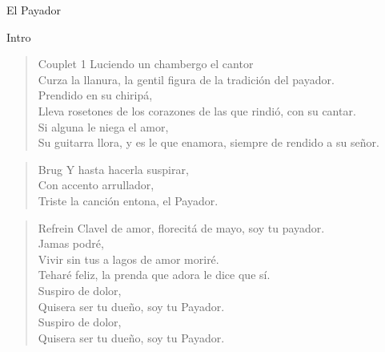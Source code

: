 \begin{song}{El Payador}

\begin{instrumental}{Intro}
\measure{}\measure{}\measure{}\measure{}\measure{}\measure{}\measure*{}
\end{instrumental}

\begin{verse}{Couplet 1}
\chord{}Luciendo un chambergo el cantor\\
Curza la llanura, la gentil figura de la tradición del payador.\\
\chord{}Prendido en su chiripá,\\
Lleva rosetones de los corazones de las que rindió, con su cantar.\\

\chord{}Si alguna le niega el amor,\\
Su guitarra llora, y es le que enamora, siempre de rendido a su señor.
\end{verse}

\begin{verse}{Brug}
\chord{}Y hasta hacerla suspirar,\\
Con accento arrullador,\\
Triste la canción entona, el Payador. 
\end{verse}

\begin{verse}{Refrein}
Clavel de amor, florecitá de mayo, soy tu payador.\\
\chord{}Jamas podré, \\
Vivir sin tus a lagos de amor moriré.  \\
Teharé feliz, la prenda que adora le dice que sí.\\
Suspiro de dolor,\\
Quisera ser tu dueño, soy tu Payador. \\ 
Suspiro de dolor,\\
Quisera ser tu dueño, soy tu Payador. \\ 
\end{verse}


\end{song}
